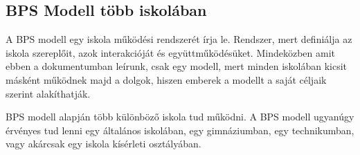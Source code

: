 \hypertarget{bps-modell-tobb-iskolaban}{%
\subsection{BPS Modell több iskolában}\label{bps-modell-tobb-iskolaban}}

A BPS modell egy iskola működési rendszerét írja le. Rendszer, mert
definiálja az iskola szereplőit, azok interakcióját és
együttműködésüket. Mindeközben amit ebben a dokumentumban leírunk, csak
egy modell, mert minden iskolában kicsit másként működnek majd a dolgok,
hiszen emberek a modellt a saját céljaik szerint alakíthatják.

BPS modell alapján több különböző iskola tud működni. A BPS modell
ugyanúgy érvényes tud lenni egy általános iskolában, egy gimnáziumban,
egy technikumban, vagy akárcsak egy iskola kísérleti osztályában.
